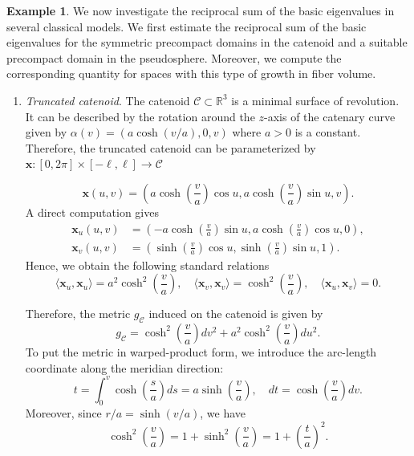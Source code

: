 \documentclass{amsart}
\theoremstyle{definition}
\newtheorem{example}[theorem]{Example}
\theoremstyle{remark}
\numberwithin{equation}{section}
\begin{document}
\begin{example}
    We now investigate the reciprocal sum of the basic eigenvalues in several classical models. We first estimate the reciprocal sum of the basic eigenvalues for the symmetric precompact domains in the catenoid and a suitable precompact domain in the pseudosphere. Moreover, we compute the corresponding quantity for spaces with this type of growth in fiber volume.

    \begin{enumerate}
        \item\emph{Truncated catenoid}. The catenoid $\mathcal{C} \subset \mathbb{R}^3$ is a minimal surface of revolution. It can be described by the rotation around the $z$-axis of the catenary curve given by $\alpha(v) = (a \cosh(v/a),0,v)$ where $a>0$ is a constant. Therefore, the truncated catenoid can be parameterized by $\mathbf{x}: [0, 2\pi] \times[-\ell,\ell] \to \mathcal{C}$ 

\begin{equation*}
\mathbf{x}(u,v)= \left( a\cosh{\left( \dfrac{v}{a} \right)\cos{u}}, a\cosh{\left( \dfrac{v}{a} \right)\sin{u}}, v \right).
\end{equation*}
A direct computation gives
\begin{equation*}
    \begin{aligned}
         \mathbf{x}_u(u,v) &= \left( -a \cosh{\left( \frac{v}{a} \right)}\sin{u}, a \cosh{\left( \frac{v}{a} \right)}\cos{u},0 \right), \\
\mathbf{x}_v(u,v)&= \left( \sinh{\left( \frac{v}{a} \right)}\cos{u},\sinh{\left( \frac{v}{a} \right)}\sin{u}, 1 \right).
    \end{aligned}
\end{equation*}
Hence, we obtain the following standard relations
\[
\langle \mathbf{x}_u, \mathbf{x}_u \rangle = a^2\cosh^2{\left( \frac{v}{a} \right)}, \quad \langle \mathbf{x}_v, \mathbf{x}_v \rangle = \cosh^2{\left( \frac{v}{a} \right)}, \quad \langle \mathbf{x}_u, \mathbf{x}_v \rangle = 0.
\]

Therefore, the metric $g_\mathcal{C}$ induced on the catenoid is given by
\begin{equation*}
g_\mathcal{C} = \cosh^2{\left( \frac{v}{a} \right)}dv^2 + a^2\cosh^2{\left( \frac{v}{a} \right)}du^2.
\end{equation*}
To put the metric in warped-product form, we introduce the arc-length
coordinate along the meridian direction:
\[
t = \int_0^v \cosh{\left( \frac{s}{a} \right)}ds = a\sinh{\left( \frac{v}{a} \right)}, 
\quad dt = \cosh{\left( \frac{v}{a} \right)}dv.
\]
Moreover, since $r/a = \sinh{(v/a)}$, we have
\[
\cosh^2{\left( \frac{v}{a} \right)} = 1+ \sinh^2{\left( \frac{v}{a} \right)} = 1+ \left( \frac{t}{a} \right)^2.
\]


\end{enumerate}
\end{example}
\end{document}

